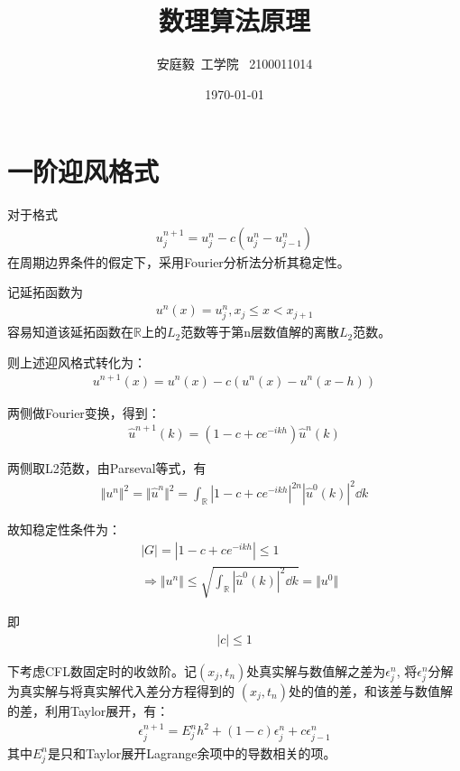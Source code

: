 \documentclass[12pt, a4paper]{article}
\title{数理算法原理}
\author{安庭毅\ 工学院 \ 2100011014}
\date{\today} %
\begin{document}
\maketitle %
\section{一阶迎风格式}
对于格式
\begin{align}
  u^{n+1}_{j} = u^{n}_{j} - c(u^n_j - u^n_{j-1})
\end{align}
在周期边界条件的假定下，采用Fourier分析法分析其稳定性。

记延拓函数为
\begin{align}
  u^n(x) = u^n_j, x_j \leqslant x < x_{j+1}
\end{align}
容易知道该延拓函数在$\mathbb{R}$上的$L_2$范数等于第n层数值解的离散$L_2$范数。

则上述迎风格式转化为：
\begin{align}
  u^{n+1}(x) = u^n(x) - c(u^n(x) - u^n(x-h))
\end{align}

两侧做Fourier变换，得到：
\begin{align}
  \hat{u}^{n+1}(k) = (1 - c + ce^{-ikh})\hat{u}^n(k)
\end{align}

两侧取L2范数，由Parseval等式，有
\begin{align}
  \Vert u^n \Vert ^2 = \Vert \hat{u}^n \Vert ^ 2 = \int _\mathbb{R} |1 - c + ce^{-ikh} |^{2n} |\hat{u}^0(k)|^2 \dd{k}
\end{align}

故知稳定性条件为：
\begin{align}
  &|G| = |1 - c + ce^{-ikh}| \leqslant 1 \\
  &\Rightarrow \Vert u^{n} \Vert \leqslant \sqrt{\int _\mathbb{R} |\hat{u}^0(k)|^2 \dd{k}} = \Vert u^0 \Vert
\end{align}

即
\begin{align}
  |c| \leqslant 1
\end{align}

下考虑CFL数固定时的收敛阶。记$(x_j, t_n)$处真实解与数值解之差为$\epsilon^n_j$, 将$\epsilon^n_j$分解为真实解与将真实解代入差分方程得到的
$(x_j, t_n)$处的值的差，和该差与数值解的差，利用Taylor展开，有：
\begin{align}
  \epsilon^{n+1}_j = E^n_j h^2 + (1 - c)\epsilon^n_j + c\epsilon^n_{j-1}
\end{align}
其中$E^n_j$是只和Taylor展开Lagrange余项中的导数相关的项。
\end{document}
